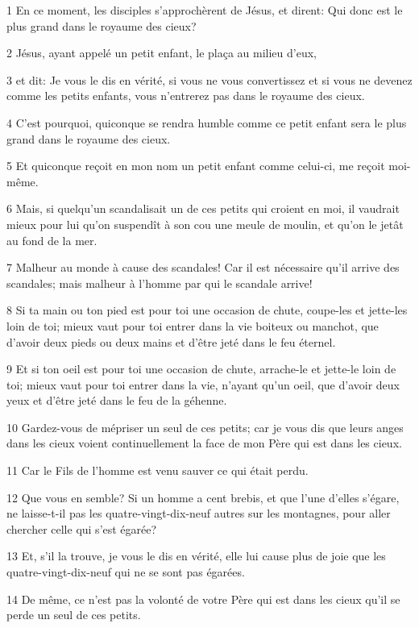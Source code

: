\par 1 En ce moment, les disciples s'approchèrent de Jésus, et dirent: Qui donc est le plus grand dans le royaume des cieux?
\par 2 Jésus, ayant appelé un petit enfant, le plaça au milieu d'eux,
\par 3 et dit: Je vous le dis en vérité, si vous ne vous convertissez et si vous ne devenez comme les petits enfants, vous n'entrerez pas dans le royaume des cieux.
\par 4 C'est pourquoi, quiconque se rendra humble comme ce petit enfant sera le plus grand dans le royaume des cieux.
\par 5 Et quiconque reçoit en mon nom un petit enfant comme celui-ci, me reçoit moi-même.
\par 6 Mais, si quelqu'un scandalisait un de ces petits qui croient en moi, il vaudrait mieux pour lui qu'on suspendît à son cou une meule de moulin, et qu'on le jetât au fond de la mer.
\par 7 Malheur au monde à cause des scandales! Car il est nécessaire qu'il arrive des scandales; mais malheur à l'homme par qui le scandale arrive!
\par 8 Si ta main ou ton pied est pour toi une occasion de chute, coupe-les et jette-les loin de toi; mieux vaut pour toi entrer dans la vie boiteux ou manchot, que d'avoir deux pieds ou deux mains et d'être jeté dans le feu éternel.
\par 9 Et si ton oeil est pour toi une occasion de chute, arrache-le et jette-le loin de toi; mieux vaut pour toi entrer dans la vie, n'ayant qu'un oeil, que d'avoir deux yeux et d'être jeté dans le feu de la géhenne.
\par 10 Gardez-vous de mépriser un seul de ces petits; car je vous dis que leurs anges dans les cieux voient continuellement la face de mon Père qui est dans les cieux.
\par 11 Car le Fils de l'homme est venu sauver ce qui était perdu.
\par 12 Que vous en semble? Si un homme a cent brebis, et que l'une d'elles s'égare, ne laisse-t-il pas les quatre-vingt-dix-neuf autres sur les montagnes, pour aller chercher celle qui s'est égarée?
\par 13 Et, s'il la trouve, je vous le dis en vérité, elle lui cause plus de joie que les quatre-vingt-dix-neuf qui ne se sont pas égarées.
\par 14 De même, ce n'est pas la volonté de votre Père qui est dans les cieux qu'il se perde un seul de ces petits.
